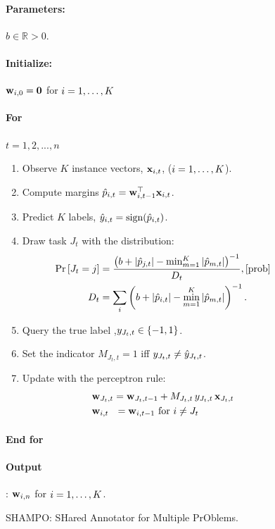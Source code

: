 {\label{sec:alg}
\begin{figure}[h]
\paragraph{Parameters:}$b\in\mathbb{R}>0$.
\paragraph{Initialize:} $\mathbf{w}_{i,0}={\boldsymbol{0}}$ for $i=1, \ldots , K$
\paragraph{For}  {$t=1,2, ..., n$} 
\begin{enumerate}
\nolineskips
\item Observe $K$ instance vectors, $\mathbf{x}_{i,t}$, ($i=1 , \ldots , K$).
\item Compute margins $\hat{p}_{i,t}={\mathbf{w}}^{\top}_{i,t-1} \mathbf{x}_{i,t}$.
\item Predict $K$ labels, $\hat{y}_{i,t}={\rm sign}(\hat{p}_{i,t})$.
\item Draw task $J_t$  with the distribution:
\begin{align}
\pr{J_t=j} &=
\frac{\paren{b+\abs{\hat{p}_{j,t}}-\min_{m=1}^K\abs{\hat{p}_{m,t}}}^{-1}}{D_{t}}, \eqref{prob}\nonumber\\
D_t &=
\sum_i \paren{b+\abs{\hat{p}_{i,t}}-\min_{m=1}^K\abs{\hat{p}_{m,t}}}^{-1}. \nonumber
\end{align}
\item Query the true label ,$y_{J_t,t}\in\{-1,1\}$.
\item Set the indicator $M_{J_t, t}=1$ iff $y_{J_t,t} \neq \hat{y}_{J_t,t}$.
\item Update with the perceptron rule:
\begin{align}
&\mathbf{w}_{J_t,t} = \mathbf{w}_{J_t,t-1}+M_{J_t,t} \, y_{J_t,t}\, \mathbf{x}_{J_t,t} \label{perc_update}\\
&\mathbf{w}_{i,t} ~~= \mathbf{w}_{i,t-1}  \textrm{ for } i \neq J_t \nonumber
\end{align}
\end{enumerate}
\paragraph{End for} 
\paragraph{Output}: $\mathbf{w}_{i,n}$ for $i=1 , \ldots , K$.
\caption{SHAMPO: SHared Annotator for Multiple PrOblems. \label{alg:SHAMPO_FO}}
\end{figure}  

}
